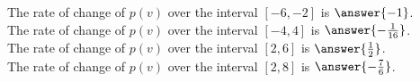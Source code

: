 \documentclass{ximera}
\begin{document}
\begin{exercise}  


The rate of change of $p(v)$ over the interval $[-6, -2]$ is $\answer{-1}$. \\

The rate of change of $p(v)$ over the interval $[-4, 4]$ is $\answer{-\frac{1}{16}}$. \\

The rate of change of $p(v)$ over the interval $[2, 6]$ is $\answer{\frac{1}{2}}$. \\

The rate of change of $p(v)$ over the interval $[2, 8]$ is $\answer{-\frac{7}{6}}$. \\

\end{exercise}
\end{document}
